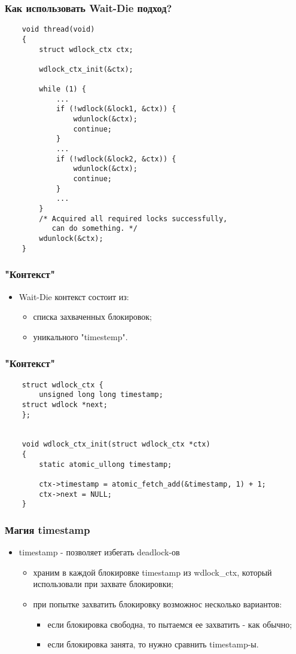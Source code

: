 \begin{frame}[fragile]
\frametitle{Как использовать Wait-Die подход?}
\begin{lstlisting}
    void thread(void)
    {
        struct wdlock_ctx ctx;

        wdlock_ctx_init(&ctx);

        while (1) {
            ...
            if (!wdlock(&lock1, &ctx)) {
                wdunlock(&ctx);
                continue;
            }
            ...
            if (!wdlock(&lock2, &ctx)) {
                wdunlock(&ctx);
                continue;
            }
            ...
        }
        /* Acquired all required locks successfully,
           can do something. */
        wdunlock(&ctx);
    }
\end{lstlisting}
\end{frame}

\begin{frame}
\frametitle{"Контекст"}
\begin{itemize}
    \item<1->Wait-Die контекст состоит из:
    \begin{itemize}
        \item<2->списка захваченных блокировок;
        \item<3->уникального "timestemp".
    \end{itemize}
\end{itemize}
\end{frame}

\begin{frame}[fragile]
\frametitle{"Контекст"}
\begin{lstlisting}
    struct wdlock_ctx {
        unsigned long long timestamp;
	struct wdlock *next;
    };


    void wdlock_ctx_init(struct wdlock_ctx *ctx)
    {
        static atomic_ullong timestamp;

        ctx->timestamp = atomic_fetch_add(&timestamp, 1) + 1;
        ctx->next = NULL;
    }
\end{lstlisting}
\end{frame}

\begin{frame}
\frametitle{Магия timestamp}
\begin{itemize}
    \item<1->timestamp - позволяет избегать deadlock-ов
    \begin{itemize}
        \item<2->храним в каждой блокировке timestamp из wdlock\_ctx, который
             использовали при захвате блокировки;
        \item<3->при попытке захватить блокировку возможнос несколько вариантов:
        \begin{itemize}
            \item<4->если блокировка свободна, то пытаемся ее захватить - как
                 обычно;
            \item<5->если блокировка занята, то нужно сравнить timestamp-ы.
        \end{itemize}
    \end{itemize}
\end{itemize}
\end{frame}

